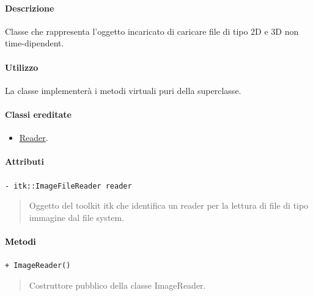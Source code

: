 \paragraph{Descrizione \\}
Classe che rappresenta l'oggetto incaricato di caricare file di tipo 2D e 3D non time-dipendent.
\paragraph{Utilizzo\\}
La classe implementerà i metodi virtuali puri della superclasse.
\paragraph{Classi ereditate\\}
\begin{itemize}
\item \hyperref[spereader]{Reader}.
\end{itemize}
\paragraph{\color{black}Attributi \\}
\color{teal}\verb!- itk::ImageFileReader reader!
\begin{quote}
\color{black}Oggetto del toolkit itk che identifica un reader per la lettura di file di tipo immagine dal file system.
\end{quote}
\paragraph{\textcolor{black}{Metodi\\}}
\color{blue}\verb!+ ImageReader()!
\begin{quote}
\color{black}Costruttore pubblico della classe ImageReader.
\end{quote}

